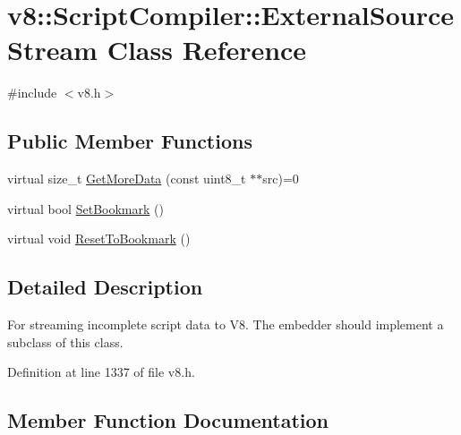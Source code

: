 \hypertarget{classv8_1_1ScriptCompiler_1_1ExternalSourceStream}{}\section{v8\+:\+:Script\+Compiler\+:\+:External\+Source\+Stream Class Reference}
\label{classv8_1_1ScriptCompiler_1_1ExternalSourceStream}


{\ttfamily \#include $<$v8.\+h$>$}

\subsection*{Public Member Functions}
\begin{DoxyCompactItemize}
\item 
virtual size\+\_\+t \mbox{\hyperlink{classv8_1_1ScriptCompiler_1_1ExternalSourceStream_ac3a0221b5725f0b612a6342d8e83d899}{Get\+More\+Data}} (const uint8\+\_\+t $\ast$$\ast$src)=0
\item 
virtual bool \mbox{\hyperlink{classv8_1_1ScriptCompiler_1_1ExternalSourceStream_a6848508547b3508a2d016738f12561e8}{Set\+Bookmark}} ()
\item 
virtual void \mbox{\hyperlink{classv8_1_1ScriptCompiler_1_1ExternalSourceStream_a425cf1ba265eeca194b805fe5c52bc19}{Reset\+To\+Bookmark}} ()
\end{DoxyCompactItemize}


\subsection{Detailed Description}
For streaming incomplete script data to V8. The embedder should implement a subclass of this class. 

Definition at line 1337 of file v8.\+h.



\subsection{Member Function Documentation}
\mbox{\label{classv8_1_1ScriptCompiler_1_1ExternalSourceStream_ac3a0221b5725f0b612a6342d8e83d899}} 
